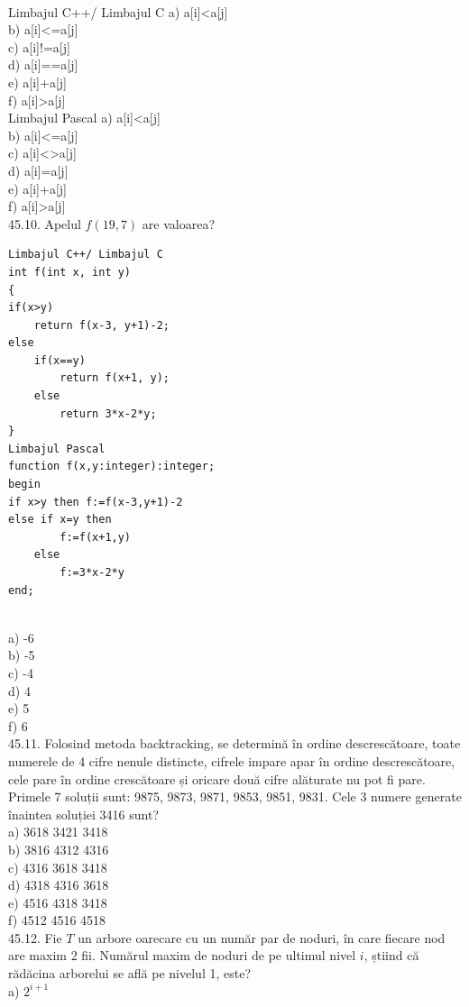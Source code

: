 \begin{itemize}
\begin{enumerate}
\\
Limbajul C++/ Limbajul C
a) a[i]<a[j]
\\
b) a[i]<=a[j]
\\
c) a[i]!=a[j]
\\
d) a[i]==a[j]
\\
e) a[i]+a[j]
\\
f) a[i]>a[j]
\\
Limbajul Pascal
a) a[i]<a[j]
\\
b) a[i]<=a[j]
\\
c) a[i]<>a[j]
\\
d) a[i]=a[j]
\\
e) a[i]+a[j]
\\
f) a[i]>a[j]
\\
45.10. Apelul $f(19,7)$ are valoarea?
\begin{verbatim}
Limbajul C++/ Limbajul C
int f(int x, int y)
{
if(x>y)
    return f(x-3, y+1)-2;
else
    if(x==y)
        return f(x+1, y);
    else
        return 3*x-2*y;
}
Limbajul Pascal
function f(x,y:integer):integer;
begin
if x>y then f:=f(x-3,y+1)-2
else if x=y then
        f:=f(x+1,y)
    else
        f:=3*x-2*y
end;
\end{verbatim}
\\
a) -6
\\
b) -5
\\
c) -4
\\
d) 4
\\
e) 5
\\
f) 6
\\
45.11. Folosind metoda backtracking, se determină în ordine descrescătoare, toate numerele de 4 cifre nenule distincte, cifrele impare apar în ordine descrescătoare, cele pare în ordine crescătoare și oricare două cifre alăturate nu pot fi pare. Primele 7 soluții sunt: 9875,  9873, 9871, 9853, 9851, 9831. Cele 3 numere generate înaintea soluției 3416 sunt?
\\
a) 3618 3421 3418
\\
b) 3816 4312 4316
\\
c) 4316 3618 3418
\\
d) 4318 4316 3618
\\
e) 4516 4318 3418
\\
f) 4512 4516 4518
\\
45.12. Fie $T$ un arbore oarecare cu un număr par de noduri, în care fiecare nod are maxim 2 fii. Numărul maxim de noduri de pe ultimul nivel $i$, știind că rădăcina arborelui se află pe nivelul 1, este?
\\
a) $2^{{i+1}}$
\\

\end{enumerate}
\end{itemize}
